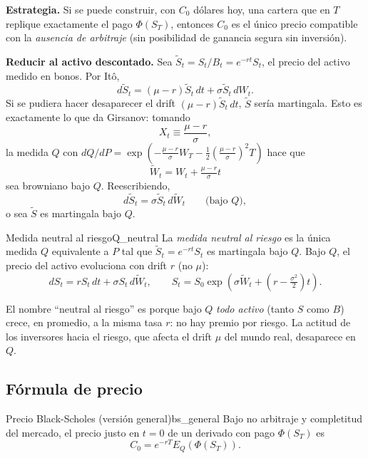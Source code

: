 \documentclass[11pt, a4paper]{article}
\begin{document}
\textbf{Estrategia.} Si se puede construir, con $C_0$ dólares hoy, una cartera que en $T$
replique exactamente el pago $\Phi(S_T)$, entonces $C_0$ es el único precio compatible con la
\emph{ausencia de arbitraje} (sin posibilidad de ganancia segura sin inversión).

\textbf{Reducir al activo descontado.} Sea $\widetilde{S}_t = S_t / B_t = e^{-rt} S_t$, el precio
del activo medido en bonos. Por Itô,
$$ d\widetilde{S}_t = (\mu - r) \widetilde{S}_t \, dt + \sigma \widetilde{S}_t \, dW_t. $$
Si se pudiera hacer desaparecer el drift $(\mu - r) \widetilde{S}_t \, dt$, $\widetilde{S}$
sería
martingala. Esto es exactamente lo que da Girsanov: tomando
$$ X_t \equiv \frac{\mu - r}{\sigma}, $$
la medida $Q$ con $dQ/dP = \exp(-\tfrac{\mu - r}{\sigma} W_T - \tfrac{1}{2}(\tfrac{\mu-r}{\sigma})^2
T)$
hace que
$$ \widetilde{W}_t = W_t + \tfrac{\mu - r}{\sigma} t $$
sea browniano bajo $Q$. Reescribiendo,
$$ d\widetilde{S}_t = \sigma \widetilde{S}_t \, d\widetilde{W}_t \qquad \text{(bajo $Q$)}, $$
o sea $\widetilde{S}$ es martingala bajo $Q$.

\begin{definicion}{Medida neutral al riesgo}{Q_neutral}
La \emph{medida neutral al riesgo} es la única medida $Q$ equivalente a $P$ tal que
$\widetilde{S}_t = e^{-rt} S_t$ es martingala bajo $Q$. Bajo $Q$, el precio del activo evoluciona
con drift $r$ (no $\mu$):
$$ dS_t = r S_t \, dt + \sigma S_t \, d\widetilde{W}_t, \qquad S_t = S_0 \exp\!\left(\sigma
\widetilde{W}_t + (r - \tfrac{\sigma^2}{2}) t\right). $$
\end{definicion}

\obs El nombre ``neutral al riesgo'' es porque bajo $Q$ \emph{todo activo} (tanto $S$ como $B$)
crece, en promedio, a la misma tasa $r$: no hay premio por riesgo. La actitud de los inversores
hacia el riesgo, que afecta el drift $\mu$ del mundo real, desaparece en $Q$.

\subsection{Fórmula de precio}

\begin{teorema}{Precio Black-Scholes (versión general)}{bs_general}
Bajo no arbitraje y completitud del mercado, el precio justo en $t = 0$ de un derivado con pago
$\Phi(S_T)$ es
$$ C_0 = e^{-rT} E_Q(\Phi(S_T)). $$
\end{teorema}
\end{document}

